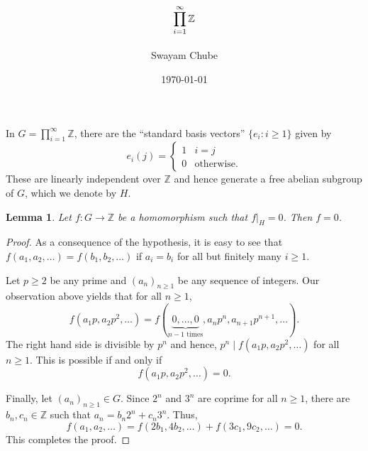 \documentclass[12pt]{article}
\title{$\displaystyle\prod_{i = 1}^\infty\Z$}
\author{Swayam Chube}
\date{\today}
\theoremstyle{thmstyle}
\newtheorem{lemma}[theorem]{Lemma}
\theoremstyle{defstyle}
\newcommand{\Z}{\mathbb{Z}}
\renewcommand{\ge}{\geqslant}
\begin{document}
\maketitle

In $G = \displaystyle\prod_{i = 1}^\infty\Z$, there are the ``standard basis vectors'' $\{e_i\colon i\ge 1\}$ given by 
\begin{equation*}
    e_i(j) = 
    \begin{cases}
        1 & i = j\\
        0 & \text{otherwise}.
    \end{cases}
\end{equation*}
These are linearly independent over $\Z$ and hence generate a free abelian subgroup of $G$, which we denote by $H$.

\begin{lemma}
    Let $f: G\to\Z$ be a homomorphism such that $f|_H = 0$. Then $f = 0$.
\end{lemma}
\begin{proof}
    As a consequence of the hypothesis, it is easy to see that $f(a_1,a_2,\dots) = f(b_1,b_2,\dots)$ if $a_i = b_i$ for all but finitely many $i\ge 1$. 

    Let $p\ge 2$ be any prime and $(a_n)_{n\ge 1}$ be any sequence of integers. Our observation above yields that for all $n\ge 1$, 
    \begin{equation*}
        f(a_1p, a_2p^2,\dots) = f(\underbrace{0,\dots,0}_{n - 1\text{ times}}, a_np^n, a_{n + 1}p^{n + 1},\dots).
    \end{equation*}
    The right hand side is divisible by $p^n$ and hence, $p^n\mid f(a_1p,a_2p^2,\dots)$ for all $n\ge 1$. This is possible if and only if 
    \begin{equation*}
        f(a_1p, a_2p^2,\dots) = 0.
    \end{equation*}

    Finally, let $(a_n)_{n\ge 1}\in G$. Since $2^n$ and $3^n$ are coprime for all $n\ge 1$, there are $b_n, c_n\in\Z$ such that $a_n = b_n2^n + c_n3^n$. Thus, 
    \begin{equation*}
        f(a_1,a_2,\dots) = f(2b_1, 4b_2, \dots) + f(3c_1, 9c_2,\dots) = 0.
    \end{equation*}
    This completes the proof.
\end{proof}
\end{document}
